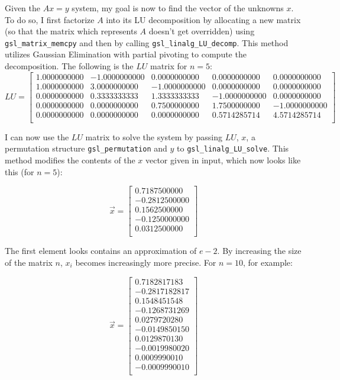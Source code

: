 \documentclass{article}
\newcommand{\code}{\texttt}
\begin{document}
Given the $Ax=y$ system, my goal is now to find the vector of the unknowns $x$. To do so, I first factorize $A$ into its LU decomposition by allocating a new matrix (so that the matrix which represents $A$ doesn't get overridden) using \code{gsl\_matrix\_memcpy} and then by calling \code{gsl\_linalg\_LU\_decomp}. This method utilizes Gaussian Elimination with partial pivoting to compute the decomposition. The following is the $LU$ matrix for $n=5$:
$$
LU=
\begin{bmatrix} 
1.0000000000 & -1.0000000000 & 0.0000000000 & 0.0000000000 & 0.0000000000\\ 
1.0000000000 & 3.0000000000 & -1.0000000000 & 0.0000000000 & 0.0000000000\\ 
0.0000000000 & 0.3333333333 & 1.3333333333 & -1.0000000000 & 0.0000000000\\ 
0.0000000000 & 0.0000000000 & 0.7500000000 & 1.7500000000 & -1.0000000000\\ 
0.0000000000 & 0.0000000000 & 0.0000000000 & 0.5714285714 & 4.5714285714\\
\end{bmatrix}
$$

I can now use the $LU$ matrix to solve the system by passing $LU$, $x$, a permutation structure \code{gsl\_permutation} and $y$ to \code{gsl\_linalg\_LU\_solve}. This method modifies the contents of the $x$ vector given in input, which now looks like this (for $n=5$):

$$
\vec{x}=
\begin{bmatrix}
0.7187500000\\
-0.2812500000\\
0.1562500000\\
-0.1250000000\\
0.0312500000\\
\end{bmatrix}
$$

The first element looks contains an approximation of $e-2$. By increasing the size of the matrix $n$, $x_i$ becomes increasingly more precise. For $n=10$, for example:

$$
\vec{x}=
\begin{bmatrix}
0.7182817183\\
-0.2817182817\\
0.1548451548\\
-0.1268731269\\
0.0279720280\\
-0.0149850150\\
0.0129870130\\
-0.0019980020\\
0.0009990010\\
-0.0009990010\\
\end{bmatrix}
$$
\end{document}
